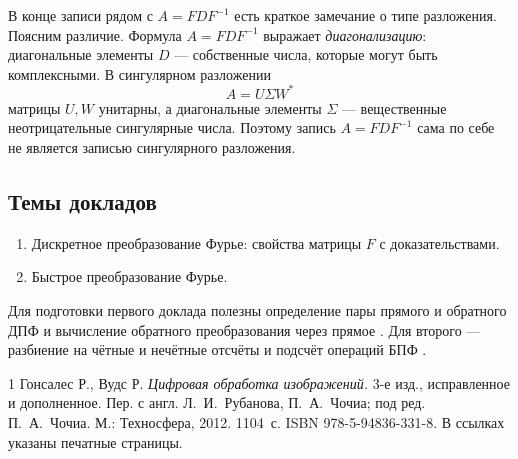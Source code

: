 \documentclass[12pt,a4paper]{article}
\theoremstyle{definition}
\theoremstyle{remark}
\begin{document}
В конце записи рядом с $A=FDF^{-1}$ есть краткое замечание о типе
разложения. Поясним различие. Формула $A=FDF^{-1}$ выражает
\emph{диагонализацию}: диагональные элементы $D$ --- собственные числа,
которые могут быть комплексными. В сингулярном разложении
\[
  A=U\Sigma W^*
\]
матрицы $U,W$ унитарны, а диагональные элементы $\Sigma$ --- вещественные
неотрицательные сингулярные числа. Поэтому запись $A=FDF^{-1}$ сама по
себе не является записью сингулярного разложения.

\subsection{Темы докладов}

\begin{enumerate}
  \item Дискретное преобразование Фурье: свойства матрицы $F$ с
        доказательствами.
  \item Быстрое преобразование Фурье.
\end{enumerate}

Для подготовки первого доклада полезны определение пары прямого
и обратного ДПФ \cite[\S\,4.4.1, с.~269--270]{GW2012}
и вычисление обратного преобразования через прямое
\cite[\S\,4.11.2, с.~352]{GW2012}.
Для второго --- разбиение на чётные и нечётные отсчёты
и подсчёт операций БПФ \cite[\S\,4.11.3, с.~353--356]{GW2012}.

\begingroup
\small
\begin{thebibliography}{1}
Гонсалес Р., Вудс Р.
\emph{Цифровая обработка изображений.}
3-е изд., исправленное и дополненное.
Пер. с англ. Л.~И.~Рубанова, П.~А.~Чочиа;
под ред. П.~А.~Чочиа. М.: Техносфера, 2012. 1104~с.
ISBN 978-5-94836-331-8.
В ссылках указаны печатные страницы.
\end{thebibliography}
\endgroup
\end{document}
